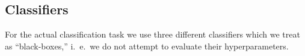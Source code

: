 





\subsection{Classifiers}
For the actual classification task we use three different classifiers which we treat as ``black-boxes,'' i.\ e.\ we do not attempt to evaluate their hyperparameters.
